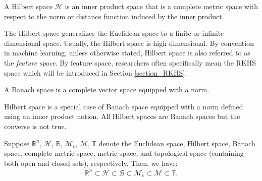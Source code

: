\documentclass[lang=cn,10pt]{gorgeousnbook}
\numberwithin{equation}{section}%
\numberwithin{figure}{section}%
\begin{document}

\begin{definition}\label{definition_Hilbert_space}
A Hilbert space $\mathcal{H}$ is an inner product space that is a complete metric space with respect to the norm or distance function induced by the inner product. 
\end{definition}
The Hilbert space generalizes the Euclidean space to a finite or infinite dimensional space. Usually, the Hilbert space is high dimensional. By convention in machine learning, unless otherwise stated, Hilbert space is also referred to as the \textit{feature space}. By feature space, researchers often specifically mean the RKHS space which will be introduced in Section \ref{section_RKHS}.

\begin{definition}
A Banach space is a complete vector space equipped with a norm. 
\end{definition}

\begin{remark}
Hilbert space is a special case of Banach space equipped with a norm defined using an inner product notion. All Hilbert spaces are Banach spaces but the converse is not true. 
\end{remark}

Suppose $\mathbb{R}^n$, $\mathcal{H}$, $\mathbb{B}$, $\mathcal{M}_c$, $\mathcal{M}$, $\mathbb{T}$ denote the Euclidean space, Hilbert space, Banach space, complete metric space, metric space, and topological space (containing both open and closed sets), respectively. Then, we have:
\begin{align}
\mathbb{R}^n \subset \mathcal{H} \subset \mathcal{B} \subset \mathcal{M}_c \subset \mathcal{M} \subset \mathbb{T}.
\end{align}
\end{document}
